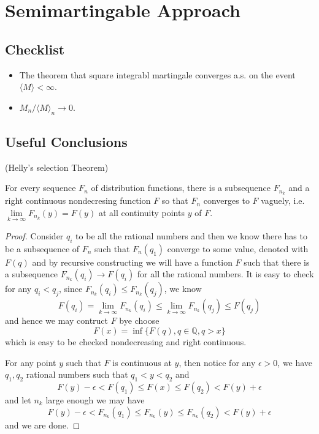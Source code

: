 \section{Semimartingable Approach}

\subsection{Checklist}
\begin{itemize}
    \item The theorem that square integrabl martingale converges a.s. on the event $\langle M\rangle < \infty$.
    \item $M_n /\langle M\rangle_n \to 0$.
\end{itemize}

\subsection{Useful Conclusions}

\begin{theorem}
    (Helly's selection Theorem)\par
    For every sequence $F_n$ of distribution functions, there is a subsequence $F_{n_k}$ and a right continuous nondecresing function $F$ so that $F_n$ converges to $F$ vaguely, i.e. $\lim\limits_{k\to\infty} F_{n_k}(y) = F(y)$ at all continuity points $y$ of $F$.
\end{theorem}
\begin{proof}
    Consider $q_i$ to be all the rational numbers and then we know there has to be a subsequence of $F_n$ such that $F_n(q_1)$ converge to some value, denoted with $F(q)$ and by recursive constructing we will have a function $F$ such that there is a subsequence $F_{n_k}(q_i) \to F(q_i)$ for all the rational numbers. It is easy to check for any $q_i < q_j$, since $F_{n_k}(q_i) \leq F_{n_k}(q_j)$, we know
    \[
    F(q_i) = \lim_{k\to\infty} F_{n_k}(q_i) \leq \lim_{k\to\infty} F_{n_k}(q_j) \leq F(q_j)
    \]
    and hence we may contruct $F$ bye choose
    \[F(x) = \inf\{F(q), q\in\mathbb{Q}, q>x\}\]
    which is easy to be checked nondecreasing and right continuous.\par
    For any point $y$ such that $F$ is continuous at $y$, then notice for any $\epsilon > 0$, we have $q_1,q_2$ rational numbers such that $q_1 < y <q_2$ and
    \[
    F(y)-\epsilon < F(q_1) \leq F(x) \leq F(q_2) < F(y)+\epsilon
    \] 
    and let $n_k$ large enough we may have
    \[
    F(y)-\epsilon < F_{n_k}(q_1) \leq F_{n_k}(y) \leq F_{n_k}(q_2) < F(y)+ \epsilon
    \]
    and we are done.
\end{proof}

